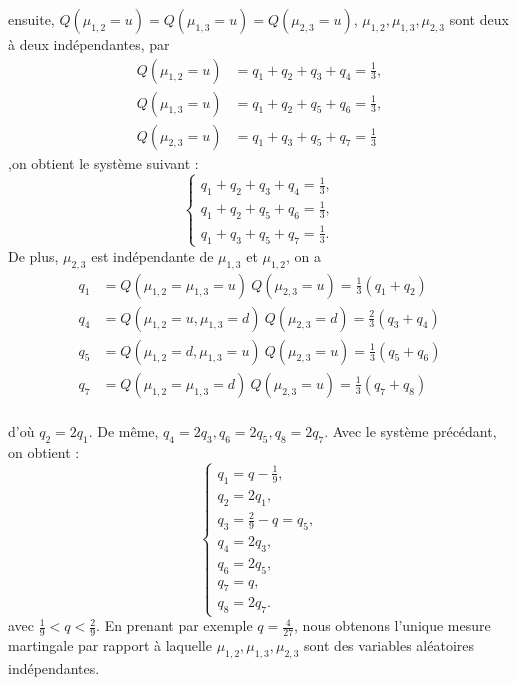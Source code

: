 ensuite, \(Q(\mu_{1,2} = u) = Q(\mu_{1,3} = u) = Q(\mu_{2,3} = u)\), \(\mu_{1,2}, \mu_{1,3}, \mu_{2,3}\) sont deux à deux indépendantes, par 
\begin{align*}
    Q(\mu_{1,2}=u)&=q_1+q_2+q_3+q_4=\frac{1}{3}, \\
    Q(\mu_{1,3}=u)&=q_1+q_2+q_5+q_6=\frac{1}{3}, \\
    Q(\mu_{2,3}=u)&=q_1+q_3+q_5+q_7=\frac{1}{3}
\end{align*},on obtient le système suivant :
\[
\begin{cases}
q_1 + q_2 + q_3 + q_4 = \frac{1}{3}, \\
q_1 + q_2 + q_5 + q_6 = \frac{1}{3}, \\
q_1 + q_3 + q_5 + q_7 = \frac{1}{3}.
\end{cases}
\]
De plus, \(\mu_{2,3}\) est indépendante de \(\mu_{1,3}\) et \(\mu_{1,2}\), on a 
\begin{align*}
q_1&=Q(\mu_{1,2}=\mu_{1,3}=u)\ Q(\mu_{2,3}=u)=\frac{1}{3}(q_1+q_2)\\
q_4&=Q(\mu_{1,2}=u,\mu_{1,3}=d)\ Q(\mu_{2,3}=d)=\frac{2}{3}(q_3+q_4)\\
q_5&=Q(\mu_{1,2}=d,\mu_{1,3}=u)\ Q(\mu_{2,3}=u)=\frac{1}{3}(q_5+q_6)\\
q_7&=Q(\mu_{1,2}=\mu_{1,3}=d)\ Q(\mu_{2,3}=u)=\frac{1}{3}(q_7+q_8)\\    
\end{align*}

d'où \(q_2 = 2q_1\). De même, \(q_4 = 2q_3, q_6 = 2q_5, q_8 = 2q_7\). Avec le système précédant, on obtient :
\[
\begin{cases}
q_1 = q - \frac{1}{9}, \\
q_2 = 2q_1, \\
q_3 = \frac{2}{9} - q = q_5, \\
q_4 = 2q_3, \\
q_6 = 2q_5, \\
q_7 = q, \\
q_8 = 2q_7.
\end{cases}
\]
avec \(\frac{1}{9} < q < \frac{2}{9}\). En prenant par exemple \(q = \frac{4}{27}\), nous obtenons l'unique mesure martingale par rapport à laquelle \(\mu_{1,2}, \mu_{1,3}, \mu_{2,3}\) sont des variables aléatoires indépendantes.


